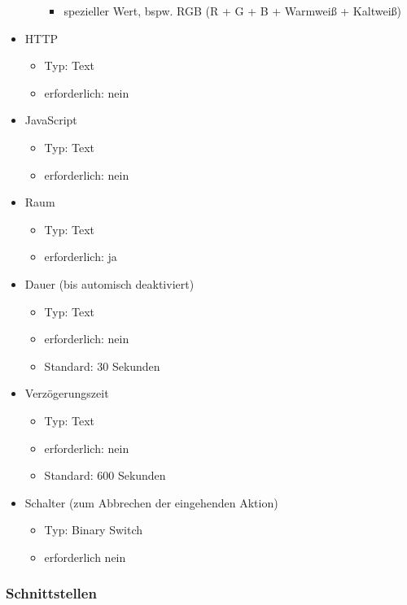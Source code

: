 \begin{itemize}
\begin{itemize}
		\begin{itemize}
			\item spezieller Wert, bspw. RGB (R + G + B + Warmweiß + Kaltweiß)
		\end{itemize}
	\end{itemize}
	\item HTTP
	\begin{itemize}
		\item Typ: Text
		\item erforderlich: nein
	\end{itemize}
	\item JavaScript
	\begin{itemize}
		\item Typ: Text
		\item erforderlich: nein
	\end{itemize}
	\item Raum
	\begin{itemize}
		\item Typ: Text
		\item erforderlich: ja
	\end{itemize}
	\item Dauer (bis automisch deaktiviert)
	\begin{itemize}
		\item Typ: Text
		\item erforderlich: nein
		\item Standard: 30 Sekunden
	\end{itemize}
	\item Verzögerungszeit
	\begin{itemize}
		\item Typ: Text
		\item erforderlich: nein
		\item Standard: 600 Sekunden
	\end{itemize}
	\item Schalter (zum Abbrechen der eingehenden Aktion)
	\begin{itemize}
		\item Typ: Binary Switch
		\item erforderlich nein
	\end{itemize}

\end{itemize}

\subsubsection{Schnittstellen}

